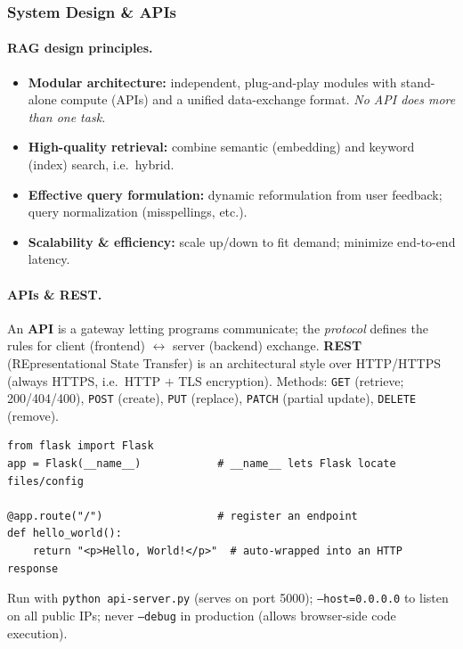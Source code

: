\documentclass{article}
\begin{document}
\subsubsection{System Design \& APIs}

\paragraph{RAG design principles.}
\begin{itemize}
    \item \textbf{Modular architecture:} independent, plug-and-play modules with stand-alone compute (APIs) and a unified data-exchange format. \textit{No API does more than one task.}
    \item \textbf{High-quality retrieval:} combine semantic (embedding) and keyword (index) search, i.e.\ hybrid.
    \item \textbf{Effective query formulation:} dynamic reformulation from user feedback; query normalization (misspellings, etc.).
    \item \textbf{Scalability \& efficiency:} scale up/down to fit demand; minimize end-to-end latency.
\end{itemize}

\paragraph{APIs \& REST.} An \textbf{API} is a gateway letting programs communicate; the \textit{protocol} defines the rules for client (frontend) $\leftrightarrow$ server (backend) exchange. \textbf{REST} (REpresentational State Transfer) is an architectural style over HTTP/HTTPS (always HTTPS, i.e.\ HTTP $+$ TLS encryption). Methods: \texttt{GET} (retrieve; 200/404/400), \texttt{POST} (create), \texttt{PUT} (replace), \texttt{PATCH} (partial update), \texttt{DELETE} (remove).

\begin{verbatim}
from flask import Flask
app = Flask(__name__)            # __name__ lets Flask locate files/config

@app.route("/")                  # register an endpoint
def hello_world():
    return "<p>Hello, World!</p>"  # auto-wrapped into an HTTP response
\end{verbatim}
\noindent Run with \texttt{python api-server.py} (serves on port 5000); \texttt{--host=0.0.0.0} to listen on all public IPs; never \texttt{--debug} in production (allows browser-side code execution).
\end{document}
